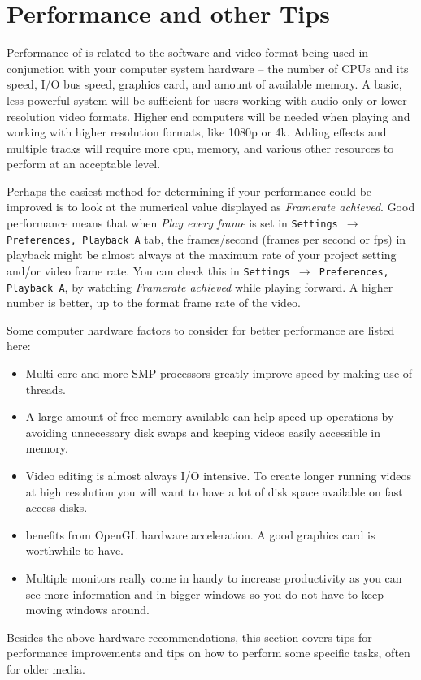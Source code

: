 \chapter{Performance and other Tips}%
\label{cha:performance_tips}

Performance of \CGG{} is related to the software and video format being used in conjunction with your computer system hardware -- the number of CPUs and its speed, I/O bus speed, graphics card, and amount of available memory. A basic, less powerful system will be sufficient for users working with audio only or lower resolution video formats.  Higher end computers will be needed when playing and working with higher resolution formats, like 1080p or 4k. Adding effects and multiple tracks will require more cpu, memory, and various other resources to 
perform at an acceptable level.

Perhaps the easiest method for determining if your performance could be improved is to look at the numerical value displayed as \textit{Framerate achieved}.  Good performance means that when \textit{Play every frame} is set 
in \texttt{Settings $\rightarrow$ Preferences, Playback A} tab, the frames/second (frames per second or fps) in playback might be almost always at the maximum rate of your project setting and/or video frame rate. You can check this in \texttt{Settings $\rightarrow$ Preferences, Playback A}, by watching \textit{Framerate achieved} while playing forward.  A higher number is better, up to the format frame rate of the video.

Some computer hardware factors to consider for better performance are listed here:
\begin{itemize}
	\item Multi-core and more SMP processors greatly improve \CGG{} speed by making use of threads.
	\item A large amount of free memory available can help speed up operations by avoiding unnecessary disk
	swaps and keeping videos easily accessible in memory.
	\item Video editing is almost always I/O intensive. To create longer running videos at high resolution
	you will want to have a lot of disk space available on fast access disks.
	\item \CGG{} benefits from OpenGL hardware acceleration. A good graphics card is worthwhile to have.
	\item Multiple monitors really come in handy to increase productivity as you can see more information and
	in bigger windows so you do not have to keep moving windows around.
\end{itemize}
Besides the above hardware recommendations, this section covers tips for performance improvements and tips on how to perform some specific tasks, often for older media.

